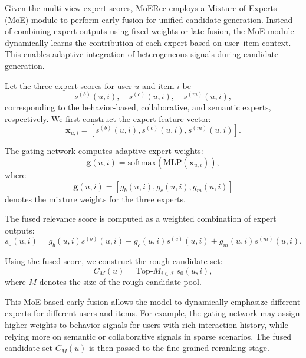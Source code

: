 \documentclass[sigconf,anonymous]{acmart}
\begin{document}
Given the multi-view expert scores, MoERec employs a Mixture-of-Experts (MoE) module to perform early fusion for unified candidate generation. Instead of combining expert outputs using fixed weights or late fusion, the MoE module dynamically learns the contribution of each expert based on user--item context. This enables adaptive integration of heterogeneous signals during candidate generation.

Let the three expert scores for user $u$ and item $i$ be
\begin{equation}
s^{(b)}(u,i), \quad s^{(c)}(u,i), \quad s^{(m)}(u,i),
\end{equation}
corresponding to the behavior-based, collaborative, and semantic experts, respectively. We first construct the expert feature vector:
\begin{equation}
\mathbf{x}_{u,i} =
\left[
s^{(b)}(u,i),
s^{(c)}(u,i),
s^{(m)}(u,i)
\right].
\end{equation}

The gating network computes adaptive expert weights:
\begin{equation}
\mathbf{g}(u,i) =
\text{softmax}\left(
\text{MLP}(\mathbf{x}_{u,i})
\right),
\end{equation}
where
\begin{equation}
\mathbf{g}(u,i) =
\left[
g_b(u,i),
g_c(u,i),
g_m(u,i)
\right]
\end{equation}
denotes the mixture weights for the three experts.

The fused relevance score is computed as a weighted combination of expert outputs:
\begin{equation}
s_0(u,i)
=
g_b(u,i)s^{(b)}(u,i)
+
g_c(u,i)s^{(c)}(u,i)
+
g_m(u,i)s^{(m)}(u,i).
\end{equation}

Using the fused score, we construct the rough candidate set:
\begin{equation}
C_M(u) = \text{Top-}M_{i \in \mathcal{I}} \; s_0(u,i),
\end{equation}
where $M$ denotes the size of the rough candidate pool.

This MoE-based early fusion allows the model to dynamically emphasize different experts for different users and items. For example, the gating network may assign higher weights to behavior signals for users with rich interaction history, while relying more on semantic or collaborative signals in sparse scenarios. The fused candidate set $C_M(u)$ is then passed to the fine-grained reranking stage.
\end{document}
